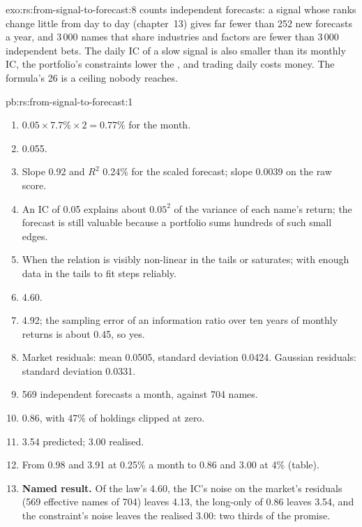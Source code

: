 \begin{solution}{exo:rs:from-signal-to-forecast:8}
 counts independent forecasts: a signal whose ranks change little from day to day (chapter~13) gives far fewer than 252 new forecasts a year,
and 3\,000 names that share industries and factors are fewer than 3\,000 independent bets. The daily IC of a slow signal is also smaller than its
monthly IC, the portfolio's constraints lower the , and trading daily costs money. The formula's 26 is a ceiling nobody reaches.
\end{solution}

\begin{solution}{pb:rs:from-signal-to-forecast:1}
\begin{enumerate}
\item $0.05 \times 7.7\% \times 2 = 0.77\%$ for the month.
\item 0.055.
\item Slope 0.92 and $R^2$ 0.24\% for the scaled forecast; slope 0.0039 on the raw score.
\item An IC of 0.05 explains about $0.05^2$ of the variance of each name's return; the forecast is still valuable because a portfolio sums hundreds of
such small edges.
\item When the relation is visibly non-linear in the tails or saturates; with enough data in the tails to fit steps reliably.
\item 4.60.
\item 4.92; the sampling error of an information ratio over ten years of monthly returns is about 0.45, so yes.
\item Market residuals: mean 0.0505, standard deviation 0.0424. Gaussian residuals: standard deviation 0.0331.
\item 569 independent forecasts a month, against 704 names.
\item 0.86, with 47\% of holdings clipped at zero.
\item 3.54 predicted; 3.00 realised.
\item From 0.98 and 3.91 at 0.25\% a month to 0.86 and 3.00 at 4\% (table).
\item \textbf{Named result.} Of the law's 4.60, the IC's noise on the market's residuals (569 effective names of 704) leaves 4.13, the long-only  of 0.86 leaves 3.54, and the constraint's noise leaves the realised 3.00: two thirds of the promise.

\end{enumerate}
\end{solution}
